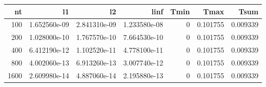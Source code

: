 \begin{tabular}{rrrrrrr}
\toprule
   nt &            l1 &            l2 &          linf &  Tmin &      Tmax &      Tsum \\
\midrule
  100 &  1.652560e-09 &  2.841310e-09 &  1.233580e-08 &     0 &  0.101755 &  0.009339 \\
  200 &  1.028000e-10 &  1.767570e-10 &  7.664530e-10 &     0 &  0.101755 &  0.009339 \\
  400 &  6.412190e-12 &  1.102520e-11 &  4.778100e-11 &     0 &  0.101755 &  0.009339 \\
  800 &  4.002060e-13 &  6.913260e-13 &  3.007740e-12 &     0 &  0.101755 &  0.009339 \\
 1600 &  2.609980e-14 &  4.887060e-14 &  2.195880e-13 &     0 &  0.101755 &  0.009339 \\
\bottomrule
\end{tabular}
